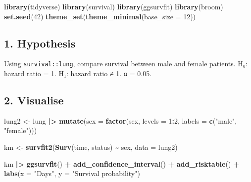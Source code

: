 \documentclass[
]{article}
\newenvironment{Shaded}{\begin{snugshade}}{\end{snugshade}}
\newcommand{\AttributeTok}[1]{\textcolor[rgb]{0.13,0.29,0.53}{#1}}
\newcommand{\DecValTok}[1]{\textcolor[rgb]{0.00,0.00,0.81}{#1}}
\newcommand{\FunctionTok}[1]{\textcolor[rgb]{0.13,0.29,0.53}{\textbf{#1}}}
\newcommand{\NormalTok}[1]{#1}
\newcommand{\OtherTok}[1]{\textcolor[rgb]{0.56,0.35,0.01}{#1}}
\newcommand{\SpecialCharTok}[1]{\textcolor[rgb]{0.81,0.36,0.00}{\textbf{#1}}}
\newcommand{\StringTok}[1]{\textcolor[rgb]{0.31,0.60,0.02}{#1}}
\begin{document}
\begin{Shaded}
\begin{Highlighting}[]
\FunctionTok{library}\NormalTok{(tidyverse)}
\FunctionTok{library}\NormalTok{(survival)}
\FunctionTok{library}\NormalTok{(ggsurvfit)}
\FunctionTok{library}\NormalTok{(broom)}
\FunctionTok{set.seed}\NormalTok{(}\DecValTok{42}\NormalTok{)}
\FunctionTok{theme\_set}\NormalTok{(}\FunctionTok{theme\_minimal}\NormalTok{(}\AttributeTok{base\_size =} \DecValTok{12}\NormalTok{))}
\end{Highlighting}
\end{Shaded}

\subsection{1. Hypothesis}\label{hypothesis}

Using \texttt{survival::lung}, compare survival between male and female
patients. H₀: hazard ratio = 1. H₁: hazard ratio ≠ 1. α = 0.05.

\subsection{2. Visualise}\label{visualise}

\begin{Shaded}
\begin{Highlighting}[]
\NormalTok{lung2 }\OtherTok{\textless{}{-}}\NormalTok{ lung }\SpecialCharTok{|\textgreater{}}
  \FunctionTok{mutate}\NormalTok{(}\AttributeTok{sex =} \FunctionTok{factor}\NormalTok{(sex, }\AttributeTok{levels =} \DecValTok{1}\SpecialCharTok{:}\DecValTok{2}\NormalTok{, }\AttributeTok{labels =} \FunctionTok{c}\NormalTok{(}\StringTok{"male"}\NormalTok{, }\StringTok{"female"}\NormalTok{)))}

\NormalTok{km }\OtherTok{\textless{}{-}} \FunctionTok{survfit2}\NormalTok{(}\FunctionTok{Surv}\NormalTok{(time, status) }\SpecialCharTok{\textasciitilde{}}\NormalTok{ sex, }\AttributeTok{data =}\NormalTok{ lung2)}

\NormalTok{km }\SpecialCharTok{|\textgreater{}}
  \FunctionTok{ggsurvfit}\NormalTok{() }\SpecialCharTok{+}
  \FunctionTok{add\_confidence\_interval}\NormalTok{() }\SpecialCharTok{+}
  \FunctionTok{add\_risktable}\NormalTok{() }\SpecialCharTok{+}
  \FunctionTok{labs}\NormalTok{(}\AttributeTok{x =} \StringTok{"Days"}\NormalTok{, }\AttributeTok{y =} \StringTok{"Survival probability"}\NormalTok{)}
\end{Highlighting}
\end{Shaded}
\end{document}
